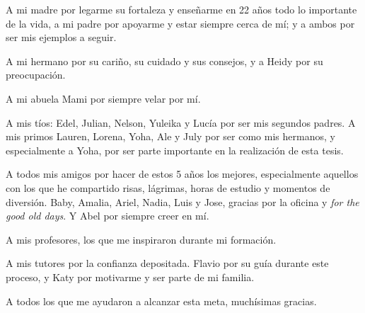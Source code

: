 \begin{acknowledgements}
	A mi madre por legarme su fortaleza y enseñarme en 22 años todo lo importante de la vida, a mi padre por apoyarme y estar siempre cerca de mí; y a ambos por ser mis ejemplos a seguir. 
	
	A mi hermano por su cariño, su cuidado y sus consejos, y a Heidy por su preocupación. 
	
	A mi abuela Mami por siempre velar por mí.
	
    A mis tíos: Edel, Julian, Nelson, Yuleika y Lucía por ser mis segundos padres. A mis primos Lauren, Lorena, Yoha, Ale y July por ser como mis hermanos, y especialmente a Yoha, por ser parte importante en la realización de esta tesis.
	 
	A todos mis amigos por hacer de estos 5 años los mejores, especialmente aquellos con los que he compartido risas, lágrimas, horas de estudio y momentos de diversión. Baby, Amalia, Ariel, Nadia, Luis y Jose, gracias por la oficina y \textit{for the good old days}. Y Abel por siempre creer en mí.  
	
	A mis profesores, los que me inspiraron durante mi formación.
	
	A mis tutores por la confianza depositada. Flavio por su guía durante este proceso, y Katy por motivarme y ser parte de mi familia.
	
	A todos los que me ayudaron a alcanzar esta meta, muchísimas gracias.
	
	
	 
	
   
\end{acknowledgements}